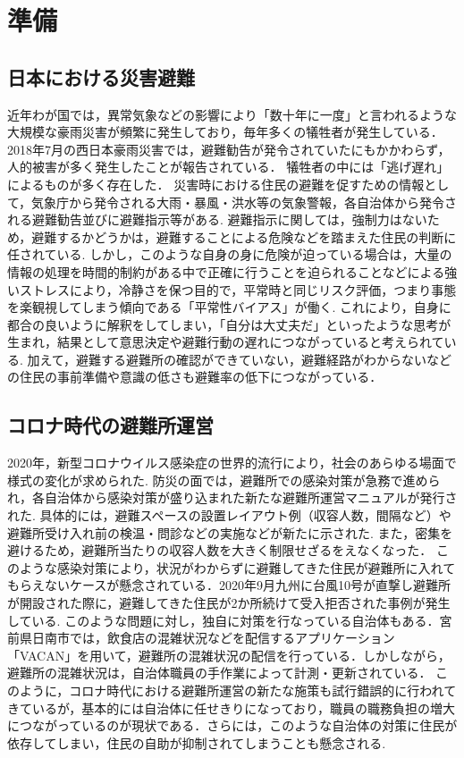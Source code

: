 \documentclass[technicalreport,dvipdfmx]{ieicej}
\begin{document}
\section{準備}
\subsection{日本における災害避難} 
近年わが国では，異常気象などの影響により「数十年に一度」と言われるような大規模な豪雨災害が頻繁に発生しており，毎年多くの犠牲者が発生している． 2018年7月の西日本豪雨災害では，避難勧告が発令されていたにもかかわらず，人的被害が多く発生したことが報告されている．\cite{1} 犠牲者の中には「逃げ遅れ」によるものが多く存在した．
災害時における住民の避難を促すための情報として，気象庁から発令される大雨・暴風・洪水等の気象警報，各自治体から発令される避難勧告並びに避難指示等がある. 避難指示に関しては，強制力はないため，避難するかどうかは，避難することによる危険などを踏まえた住民の判断に任されている. しかし，このような自身の身に危険が迫っている場合は，大量の情報の処理を時間的制約がある中で正確に行うことを迫られることなどによる強いストレスにより，冷静さを保つ目的で，平常時と同じリスク評価，つまり事態を楽観視してしまう傾向である「平常性バイアス」が働く. これにより，自身に都合の良いように解釈をしてしまい，「自分は大丈夫だ」といったような思考が生まれ，結果として意思決定や避難行動の遅れにつながっていると考えられている. \cite{2} 加えて，避難する避難所の確認ができていない，避難経路がわからないなどの住民の事前準備や意識の低さも避難率の低下につながっている．

\subsection{コロナ時代の避難所運営}
2020年，新型コロナウイルス感染症の世界的流行により，社会のあらゆる場面で様式の変化が求められた. 防災の面では，避難所での感染対策が急務で進められ，各自治体から感染対策が盛り込まれた新たな避難所運営マニュアルが発行された. 具体的には，避難スペースの設置レイアウト例（収容人数，間隔など）や避難所受け入れ前の検温・問診などの実施などが新たに示された. また，密集を避けるため，避難所当たりの収容人数を大きく制限せざるをえなくなった．
このような感染対策により，状況がわからずに避難してきた住民が避難所に入れてもらえないケースが懸念されている．2020年9月九州に台風10号が直撃し避難所が開設された際に，避難してきた住民が2か所続けて受入拒否された事例が発生している\cite{8}. 
このような問題に対し，独自に対策を行なっている自治体もある．宮前県日南市では，飲食店の混雑状況などを配信するアプリケーション「VACAN」を用いて，避難所の混雑状況の配信を行っている．しかしながら，避難所の混雑状況は，自治体職員の手作業によって計測・更新されている．
このように，コロナ時代における避難所運営の新たな施策も試行錯誤的に行われてきているが，基本的には自治体に任せきりになっており，職員の職務負担の増大につながっているのが現状である．さらには，このような自治体の対策に住民が依存してしまい，住民の自助が抑制されてしまうことも懸念される. 
\end{document}
